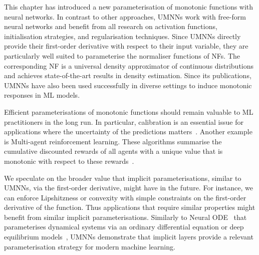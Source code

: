 This chapter has introduced a new parameterisation of monotonic functions with neural networks. In contrast to other approaches, UMNNs work with free-form neural networks and benefit from all research on activation functions, initialisation strategies, and regularisation techniques. Since UMNNs directly provide their first-order derivative with respect to their input variable, they are particularly well suited to parameterise the normaliser functions of NFs. The corresponding NF is a universal density approximator of continuous distributions and achieves state-of-the-art results in density estimation. Since its publications, UMNNs have also been used successfully in diverse settings to induce monotonic responses in ML models.

Efficient parameterisations of monotonic functions should remain valuable to ML practitioners in the long run. In particular, calibration is an essential issue for applications where the uncertainty of the predictions matters~\citep{minderer2021revisiting, guo2017calibration, cranmer2015approximating}. Another example is Multi-agent reinforcement learning. These algorithms summarise the cumulative discounted rewards of all agents with a unique value that is monotonic with respect to these rewards~\citep{rashid2018qmix, leroy2020qvmix}.

We speculate on the broader value that implicit parameterisations, similar to UMNNs, via the first-order derivative, might have in the future. For instance, we can enforce Lipshitzness or convexity with simple constraints on the first-order derivative of the function. Thus applications that require similar properties might benefit from similar implicit parameterisations. Similarly to Neural ODE~\citep{chen_neural_2018} that parameterises dynamical systems via an ordinary differential equation or deep equilibrium models~\citep{bai2019deep}, UMNNs demonstrate that implicit layers provide a relevant parameterisation strategy for modern machine learning.

